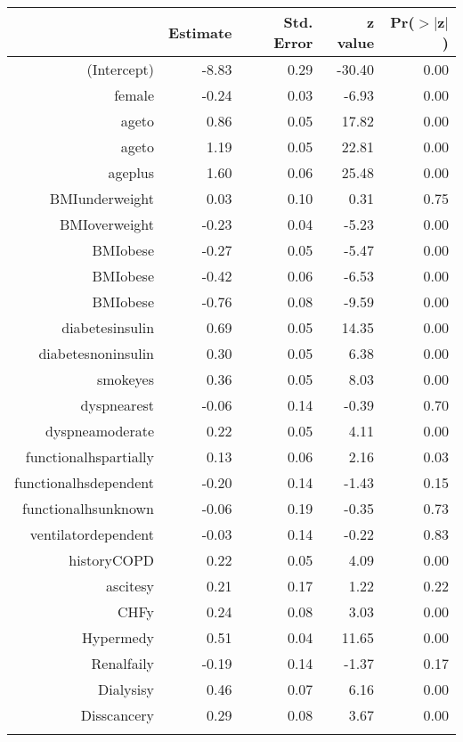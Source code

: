 \bigskip\bigskip
\centering
\begin{tabular}{rrrrr}
  \hline
 & Estimate & Std. Error & z value & Pr($>$$|$z$|$) \\ 
  \hline
(Intercept) & -8.83 & 0.29 & -30.40 & 0.00 \\ 
  female & -0.24 & 0.03 & -6.93 & 0.00 \\ 
  age\-65\-to\-74 & 0.86 & 0.05 & 17.82 & 0.00 \\ 
  age\-75\-to\-84 & 1.19 & 0.05 & 22.81 & 0.00 \\ 
  age\-85\-plus & 1.60 & 0.06 & 25.48 & 0.00 \\ 
  BMI\-underweight & 0.03 & 0.10 & 0.31 & 0.75 \\ 
  BMI\-overweight & -0.23 & 0.04 & -5.23 & 0.00 \\ 
  BMI\-obese\-1 & -0.27 & 0.05 & -5.47 & 0.00 \\ 
  BMI\-obese\-2 & -0.42 & 0.06 & -6.53 & 0.00 \\ 
  BMI\-obese\-3 & -0.76 & 0.08 & -9.59 & 0.00 \\ 
  diabetes\-insulin & 0.69 & 0.05 & 14.35 & 0.00 \\ 
  diabetes\-noninsulin & 0.30 & 0.05 & 6.38 & 0.00 \\ 
  smoke\-yes & 0.36 & 0.05 & 8.03 & 0.00 \\ 
  dyspnea\-rest & -0.06 & 0.14 & -0.39 & 0.70 \\ 
  dyspnea\-moderate & 0.22 & 0.05 & 4.11 & 0.00 \\ 
  functional\-hs\-partially & 0.13 & 0.06 & 2.16 & 0.03 \\ 
  functional\-hs\-dependent & -0.20 & 0.14 & -1.43 & 0.15 \\ 
  functional\-hs\-unknown & -0.06 & 0.19 & -0.35 & 0.73 \\ 
  ventilator\-dependent & -0.03 & 0.14 & -0.22 & 0.83 \\ 
  history\-COPD & 0.22 & 0.05 & 4.09 & 0.00 \\ 
  ascites\-y & 0.21 & 0.17 & 1.22 & 0.22 \\ 
  CHF\-y & 0.24 & 0.08 & 3.03 & 0.00 \\ 
  Hyper\-med\-y & 0.51 & 0.04 & 11.65 & 0.00 \\ 
  Renal\-fail\-y & -0.19 & 0.14 & -1.37 & 0.17 \\ 
  Dialysis\-y & 0.46 & 0.07 & 6.16 & 0.00 \\ 
  Diss\-cancer\-y & 0.29 & 0.08 & 3.67 & 0.00 \\ 
$$
\end{tabular}

